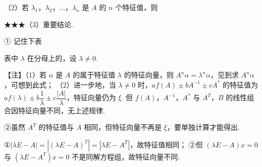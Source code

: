 （2）若 $\lambda_1$，$\lambda_2$，$\dots$，$\lambda_n$ 是 $A$ 的 $n$ 个特征值，则

★★★（3）重要结论.


\begin{fkey}{① 记住下表}
\end{fkey}

表中 $\lambda$ 在分母上的，设 $\lambda\ne0$.


\begin{fnote}
【注】（1）若 $\alpha$ 是 $A$ 的属于特征值 $\lambda$ 的特征向量，则 $A^{n}\alpha=\lambda^{n}\alpha$，见到求 $A^{n}\alpha$，可想到此式；
（2）进一步地，当 $\lambda\ne0$ 时，$af(A)\pm bA^{-1}\pm cA^{*}$ 的特征值为 $af(\lambda)\pm b\dfrac{1}{\lambda}\pm c\dfrac{|A|}{\lambda}$，特征向量仍为 $\xi$. 但 $f(A)$，$A^{-1}$，$A^{*}$ 与 $A^{T}$，$B$ 的线性组合因特征向量不同，无上述规律.
\end{fnote}

②虽然 $A^{T}$ 的特征值与 $A$ 相同，但特征向量不再是 $\xi$，要单独计算才能得出.

\begin{fnote}
①$|\lambda E-A|=|(\lambda E-A)^{T}|=|\lambda E-A^{T}|$，故特征值相同；
②但 $(\lambda E-A)x=0$ 与 $(\lambda E-A^{T})x=0$ 不是同解方程组，故特征向量不同.
\end{fnote}

